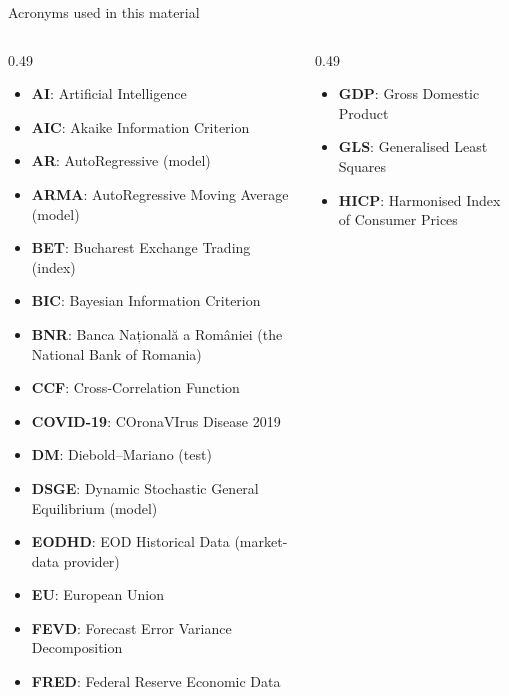 {
\begin{frame}[noframenumbering]
    \titlepage
\end{frame}
}
\begin{frame}{Acronyms used in this material}
\begin{columns}[T]
\begin{column}{0.49\textwidth}
\begin{itemize}\setlength{\itemsep}{0pt}
    \item \textbf{AI}: Artificial Intelligence
    \item \textbf{AIC}: Akaike Information Criterion
    \item \textbf{AR}: AutoRegressive (model)
    \item \textbf{ARMA}: AutoRegressive Moving Average (model)
    \item \textbf{BET}: Bucharest Exchange Trading (index)
    \item \textbf{BIC}: Bayesian Information Criterion
    \item \textbf{BNR}: Banca Națională a României (the National Bank of Romania)
    \item \textbf{CCF}: Cross-Correlation Function
    \item \textbf{COVID-19}: COronaVIrus Disease 2019
    \item \textbf{DM}: Diebold–Mariano (test)
    \item \textbf{DSGE}: Dynamic Stochastic General Equilibrium (model)
    \item \textbf{EODHD}: EOD Historical Data (market-data provider)
    \item \textbf{EU}: European Union
    \item \textbf{FEVD}: Forecast Error Variance Decomposition
    \item \textbf{FRED}: Federal Reserve Economic Data
\end{itemize}
\end{column}
\begin{column}{0.49\textwidth}
\begin{itemize}\setlength{\itemsep}{0pt}
    \item \textbf{GDP}: Gross Domestic Product
    \item \textbf{GLS}: Generalised Least Squares
    \item \textbf{HICP}: Harmonised Index of Consumer Prices

\end{itemize}
\end{column}
\end{columns}
\end{frame}

